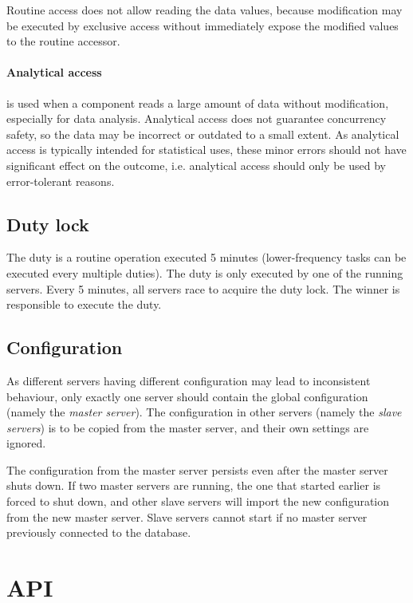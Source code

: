 \documentclass{report}
\begin{document}
					Routine access does not allow reading the data values, because modification may be executed by exclusive access
					without immediately expose the modified values to the routine accessor.

				\paragraph{Analytical access} is used when a component reads a large amount of data without modification, especially for data analysis.
				Analytical access does not guarantee concurrency safety, so the data may be incorrect or outdated to a small extent.
				As analytical access is typically intended for statistical uses, these minor errors should not have significant effect on the outcome,
				i.e. analytical access should only be used by error-tolerant reasons.

				\subsection{Duty lock}

					The duty is a routine operation executed 5 minutes (lower-frequency tasks can be executed every multiple duties).
					The duty is only executed by one of the running servers.
					Every 5 minutes, all servers race to acquire the duty lock.
					The winner is responsible to execute the duty.

				\subsection{Configuration}

					As different servers having different configuration may lead to inconsistent behaviour,
					only exactly one server should contain the global configuration (namely the \emph{master server}).
					The configuration in other servers (namely the \emph{slave servers}) is to be copied from the master server,
					and their own settings are ignored.

					The configuration from the master server persists even after the master server shuts down.
					If two master servers are running, the one that started earlier is forced to shut down,
					and other slave servers will import the new configuration from the new master server.
					Slave servers cannot start if no master server previously connected to the database.

		\section{API}
\end{document}
